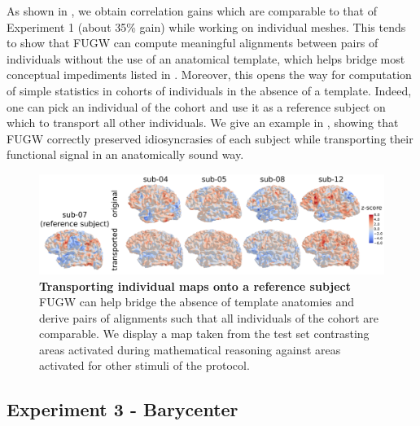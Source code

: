 As shown in ,
we obtain correlation gains which are comparable to that of Experiment 1 (about 35\% gain)
while working on individual meshes.
This tends to show that FUGW can compute meaningful alignments between pairs of individuals
without the use of an anatomical template, which helps bridge most conceptual impediments listed
in .
Moreover, this opens the way for computation of simple statistics in cohorts of individuals
in the absence of a template. Indeed, one can pick an individual of the cohort and use it
as a reference subject on which to transport all other individuals.
We give an example in ,
showing that FUGW correctly preserved idiosyncrasies of each subject while
transporting their functional signal in an anatomically sound way.
\begin{figure}[H]
    \centering
    \includegraphics[width=1\columnwidth]{./Chapitre4/figures/individual_alignment.pdf}
    \caption{
        \textbf{Transporting individual maps onto a reference subject}
        FUGW can help bridge the absence of template anatomies
        and derive pairs of alignments such that all individuals
        of the cohort are comparable. We display a map taken from the test set contrasting areas activated during mathematical reasoning against areas activated for other stimuli of the protocol.
    }
    \label{fig:individual_projections}
\end{figure}

\subsection{Experiment 3 - Barycenter}

